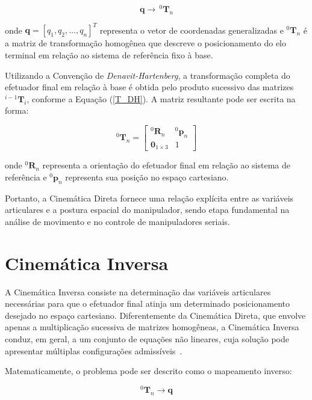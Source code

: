 \begin{equation}
\mathbf{q} \longrightarrow \, ^0\mathbf{T}_n
\end{equation}

onde $\mathbf{q} = [q_1, q_2, \dots, q_n]^T$ representa o vetor de coordenadas generalizadas e $^0\mathbf{T}_n$ é a matriz de transformação homogênea que descreve o posicionamento do elo terminal em relação ao sistema de referência fixo à base.

Utilizando a Convenção de \textit{Denavit-Hartenberg}, a transformação completa do efetuador final em relação à base é obtida pelo produto sucessivo das matrizes $^{i-1}\mathbf{T}_i$, conforme a Equação (\ref{T_DH}). A matriz resultante pode ser escrita na forma:

\begin{equation}
^0\mathbf{T}_n =
\begin{bmatrix}
^0\mathbf{R}_n & ^0\mathbf{p}_n \\
\mathbf{0}_{1\times3} & 1
\end{bmatrix}
\end{equation}

onde $^0\mathbf{R}_n$ representa a orientação do efetuador final em relação ao sistema de referência e $^0\mathbf{p}_n$ representa sua posição no espaço cartesiano.

Portanto, a Cinemática Direta fornece uma relação explícita entre as variáveis articulares e a postura espacial do manipulador, sendo etapa fundamental na análise de movimento e no controle de manipuladores seriais.

\section{Cinemática Inversa}
\label{sec:cinematica_inversa}
A Cinemática Inversa consiste na determinação das variáveis articulares necessárias para que o efetuador final atinja um determinado posicionamento desejado no espaço cartesiano. Diferentemente da Cinemática Direta, que envolve apenas a multiplicação sucessiva de matrizes homogêneas, a Cinemática Inversa conduz, em geral, a um conjunto de equações não lineares, cuja solução pode apresentar múltiplas configurações admissíveis~\cite{craig2005,siciliano2009}.

Matematicamente, o problema pode ser descrito como o mapeamento inverso:

\begin{equation}
^0\mathbf{T}_n \longrightarrow \mathbf{q}
\end{equation}

